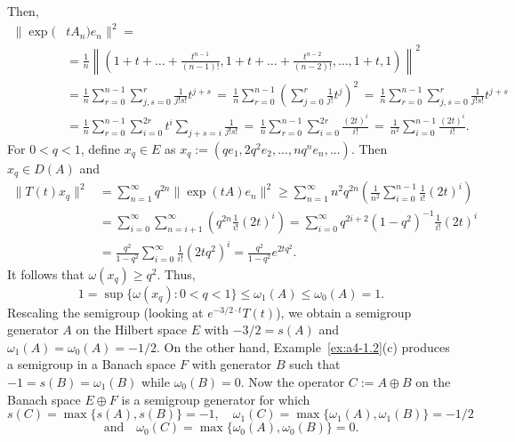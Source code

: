 \begin{example}
Then,
\begin{align*}
\|\exp(&t A_n) e_n\|^2 = \\
&= \frac{1}{n} \left\| (1 + t + \dots + \frac{t^{n-1}}{(n-1)!}, 1 + t + \dots + \frac{t^{n-2}}{(n-2)!}, \dots, 1+t, 1) \right\|^2 \\
&=
\frac{1}{n} \sum_{r=0}^{n-1} \sum_{j,s=0}^{r} \frac{1}{j!s!} t^{j+s} \, = \,
\frac{1}{n} \sum_{r=0}^{n-1} \left(\sum_{j=0}^{r} \frac{1}{j!} t^j \right)^2 
\, = \, \frac{1}{n} \sum_{r=0}^{n-1} \sum_{j,s=0}^{r} \frac{1}{j!s!} t^{j+s} \\
&= 
\frac{1}{n} \sum_{r=0}^{n-1} \sum_{i=0}^{2r} t^i \sum_{j+s=i} \frac{1}{j!s!} \,
= \, 
\frac{1}{n} \sum_{r=0}^{n-1} \sum_{i=0}^{2r} \frac{(2t)^i}{i!} \,  = \,  \frac{1}{n^2} \sum_{i=0}^{n-1} \frac{(2t)^i}{i!}.
\end{align*}
 For $ 0 < q < 1 $, define $ x_q \in E $ as  
$
x_q := (q e_1, 2q^2 e_2, ..., n q^n e_n, ...).
$
Then $x_q \in D(A)$ and
\begin{align*}
\|T(t)x_q\|^2 & = \sum_{n=1}^{\infty} q^{2n} \| \exp(t A) e_n \|^2
\geq \sum_{n=1}^{\infty} n^2 q^{2n} \left(\frac{1}{n^2} \sum_{i=0}^{n-1}  \frac{1}{i!} (2t)^i \right)\\
&= \sum_{i=0}^{\infty} \sum_{n=i+1}^{\infty} \left( q^{2n} \frac{1}{i!} (2t)^i \right)
= \sum_{i=0}^{\infty} q^{2i+2} (1 - q^2)^{-1} \frac{1}{i!} (2t)^i \\
&= \frac{q^2}{1 - q^2} \sum_{i=0}^{\infty} \frac{1}{i!} (2t q^2)^i
= \frac{q^2}{1 - q^2} e^{2t q^2}.
\end{align*}
It follows that $\omega(x_q) \geq q^2$. 
Thus,
\[
1 = \sup \{\omega(x_q)\colon0 < q < 1\} \leq \omega_1(A) \leq \omega_0(A) = 1.
\]
Rescaling the semigroup (\ie looking at $e^{-3/2 \cdot t} T(t)$), we obtain a semigroup generator $A$ on the Hilbert space $E$ with $-3/2 = s(A)$ and $\omega_1(A) = \omega_0(A) = -1/2$. 
On the other hand, Example~\ref{ex:a4-1.2}(c) produces a semigroup in a Banach space $F$ with generator $B$ such that $-1 = s(B) = \omega_1(B)$ while $\omega_0(B) = 0$. 
Now the operator $C := A \oplus B$ on the Banach space $E \oplus F$ is a semigroup generator for which
\[
s(C) = \max \{s(A), s(B)\} = -1, \quad \omega_1(C) = \max\{\omega_1(A), \omega_1(B)\} = -1/2
\]
\[
\text{and} \quad \omega_0(C) = \max\{\omega_0(A), \omega_0(B)\} = 0.
\]
\end{example}
